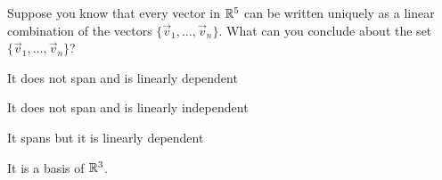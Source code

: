 \documentclass{article}
\begin{document}
\begin{readinessAssuranceTest}
\item Suppose you know that every vector in $\mathbb{R}^5$ can be written uniquely as a linear combination of the vectors $\{\vec{v}_1, \ldots, \vec{v}_n\}$.  What can you conclude about the set $\{\vec{v}_1, \ldots, \vec{v}_n\}$?

\begin{readinessAssuranceTestChoices}
\item It does not span and is linearly dependent
\item It does not span and is linearly independent
\item It spans but it is linearly dependent
\item It is a basis of $\mathbb{R}^3$.
\end{readinessAssuranceTestChoices}

\end{readinessAssuranceTest}
\end{document}
